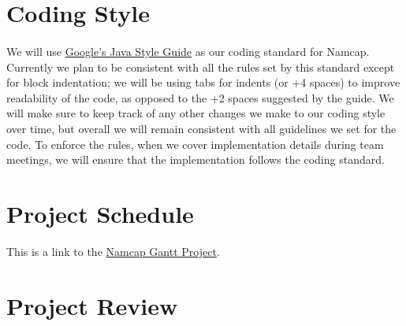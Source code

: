 \documentclass{article}
\begin{document}
\section{Coding Style}

\paragraph{}

We will use \href{https://google.github.io/styleguide/javaguide.html}{Google's Java Style Guide} as our coding standard for Namcap. Currently we plan to be consistent with all the rules set by this standard except for block indentation; we will be using tabs for indents (or +4 spaces) to improve readability of the code, as opposed to the +2 spaces suggested by the guide. We will make sure to keep track of any other changes we make to our coding style over time, but overall we will remain consistent with all guidelines we set for the code. To enforce the rules, when we cover implementation details during team meetings, we will ensure that the implementation follows the coding standard.

\section{Project Schedule}

This is a link to the \href{run:NamcapGanttProject.gan}{Namcap Gantt Project}.

\section{Project Review}
\end{document}
